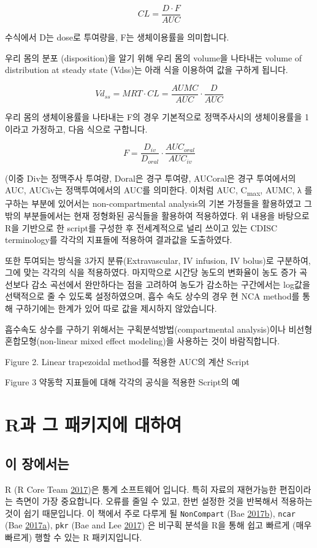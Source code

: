 \documentclass[12pt,]{krantz}
\theoremstyle{definition}
\theoremstyle{definition}
\theoremstyle{definition}
\theoremstyle{remark}
\begin{document}
\[
CL = \frac{D \cdot F}{AUC}
\]

수식에서 D는 dose로 투여량을, F는 생체이용률을 의미합니다.

우리 몸의 분포 (disposition)을 알기 위해 우리 몸의 volume을 나타내는
volume of distribution at steady state (Vdss)는 아래 식을 이용하여 값을
구하게 됩니다.

\[
Vd_{ss} = MRT \cdot CL = \frac{AUMC}{AUC} \cdot \frac{D}{AUC}
\]

우리 몸의 생체이용률을 나타내는 F의 경우 기본적으로 정맥주사시의
생체이용률을 1이라고 가정하고, 다음 식으로 구합니다.

\[
F = \frac{D_{iv}}{D_{oral}} \cdot \frac{AUC_{oral}}{AUC_{iv}}
\]

(이중 Div는 정맥주사 투여량, Doral은 경구 투여량, AUCoral은 경구
투여에서의 AUC, AUCiv는 정맥투여에서의 AUC를 의미한다. 이처럼 AUC,
C\textsubscript{max}, AUMC, λ 를 구하는 부분에 있어서는
non-compartmental analysis의 기본 가정들을 활용하였고 그 밖의
부분들에서는 현재 정형화된 공식들을 활용하여 적용하였다. 위 내용을
바탕으로 R을 기반으로 한 script를 구성한 후 전세계적으로 널리 쓰이고
있는 CDISC terminology를 각각의 지표들에 적용하여 결과값을 도출하였다.

또한 투여되는 방식을 3가지 분류(Extravascular, IV infusion, IV bolus)로
구분하여, 그에 맞는 각각의 식을 적용하였다. 마지막으로 시간당 농도의
변화율이 농도 증가 곡선보다 감소 곡선에서 완만하다는 점을 고려하여
농도가 감소하는 구간에서는 log값을 선택적으로 줄 수 있도록 설정하였으며,
흡수 속도 상수의 경우 현 NCA method를 통해 구하기에는 한계가 있어 따로
값을 제시하지 않았습니다.

흡수속도 상수를 구하기 위해서는 구획분석방법(compartmental analysis)이나
비선형 혼합모형(non-linear mixed effect modeling)을 사용하는 것이
바람직합니다.

Figure 2. Linear trapezoidal method를 적용한 AUC의 계산 Script

Figure 3 약동학 지표들에 대해 각각의 공식을 적용한 Script의 예

\chapter{R과 그 패키지에 대하여}\label{R-and-packages}

\section{이 장에서는}\label{summary-r-packages}

R (R Core Team \protect\hyperlink{ref-R-base}{2017})은 통계 소프트웨어
입니다. 특히 자료의 재현가능한 편집이라는 측면이 가장 중요합니다. 오류를
줄일 수 있고, 한번 설정한 것을 반복해서 적용하는 것이 쉽기 때문입니다.
이 책에서 주로 다루게 될 \texttt{NonCompart} (Bae
\protect\hyperlink{ref-R-NonCompart}{2017}\protect\hyperlink{ref-R-NonCompart}{b}),
\texttt{ncar} (Bae
\protect\hyperlink{ref-R-ncar}{2017}\protect\hyperlink{ref-R-ncar}{a}),
\texttt{pkr} (Bae and Lee \protect\hyperlink{ref-R-pkr}{2017}) 은 비구획
분석을 R을 통해 쉽고 빠르게 (매우 빠르게) 행할 수 있는 R 패키지입니다.
\end{document}
